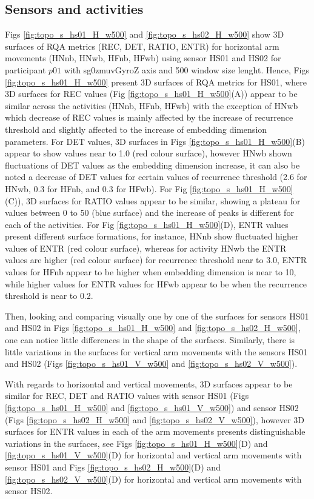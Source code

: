 \subsection{Sensors and activities}
Figs \ref{fig:topo_s_hs01_H_w500} and \ref{fig:topo_s_hs02_H_w500} show
3D surfaces of RQA metrics (REC, DET, RATIO, ENTR) for horizontal arm 
movements (HNnb, HNwb, HFnb, HFwb) using sensor HS01 and HS02 
for participant $p01$ with sg0zmuvGyroZ axis and 500 window size lenght.
Hence, Figs \ref{fig:topo_s_hs01_H_w500} present 3D surfaces of RQA metrics 
for HS01, where 3D surfaces for REC values 
(Fig \ref{fig:topo_s_hs01_H_w500}(A)) appear to be similar across 
the activities (HNnb, HFnb, HFwb) with the exception of HNwb which 
decrease of REC values is mainly affected by the increase of recurrence 
threshold and slightly affected to the increase of embedding dimension 
parameters. For DET values, 3D surfaces in Figs \ref{fig:topo_s_hs01_H_w500}(B)
appear to show values near to 1.0 (red colour surface), however HNwb 
shown fluctuations of DET values as the embedding dimension increase, 
it can also be noted a decrease of DET values for certain values of 
recurrence threshold (2.6 for HNwb, 0.3 for HFnb, and 0.3 for HFwb).
For Fig \ref{fig:topo_s_hs01_H_w500}(C)), 3D surfaces for RATIO values 
appear to be similar, showing a plateau for values between 0 to 50 
(blue surface) and the increase of peaks is different for each of the 
activities.
For Fig \ref{fig:topo_s_hs01_H_w500}(D), ENTR values present different 
surface formations, for instance, 
HNnb show fluctuated higher values of ENTR (red colour surface),
whereas for activity HNwb the ENTR values are higher (red colour surface) 
for recurrence threshold near to 3.0,
ENTR values for HFnb appear to be higher when embedding dimension is near 
to 10, while higher values for ENTR values for HFwb appear to be 
when the recurrence threshold is near to 0.2.

Then, looking and comparing visually one by one of the surfaces for sensors 
HS01 and HS02 in Figs \ref{fig:topo_s_hs01_H_w500} 
and \ref{fig:topo_s_hs02_H_w500}, one can notice little differences in the 
shape of the surfaces.
Similarly, there is little variations in the surfaces for vertical arm 
movements with the sensors HS01 and HS02 
(Figs \ref{fig:topo_s_hs01_V_w500} and \ref{fig:topo_s_hs02_V_w500}).

With regards to horizontal and vertical movements, 
3D surfaces appear to be similar for REC, DET and RATIO values
with sensor HS01
(Figs \ref{fig:topo_s_hs01_H_w500} and \ref{fig:topo_s_hs01_V_w500})
and sensor HS02
(Figs \ref{fig:topo_s_hs02_H_w500} and \ref{fig:topo_s_hs02_V_w500}), 
however 3D surfaces for ENTR values in each of the arm movements
presents distinguishable variations in the surfaces,
see Figs \ref{fig:topo_s_hs01_H_w500}(D) and \ref{fig:topo_s_hs01_V_w500}(D) 
for horizontal and vertical arm movements with sensor HS01 and
Figs \ref{fig:topo_s_hs02_H_w500}(D) and \ref{fig:topo_s_hs02_V_w500}(D) 
for horizontal and vertical arm movements with sensor HS02.

